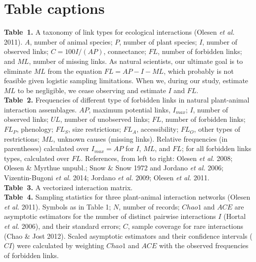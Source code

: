 \documentclass[12pt]{article}
\begin{document}
\section*{Table captions}
\noindent \textbf{Table~1.} A taxonomy of link types for ecological interactions (Olesen \emph{et al.} 2011). $A$, number of animal species; $P$, number of plant species; $I$, number of observed links; $C= 100 I/(AP)$, connectance; $FL$, number of forbidden links; and $ML$, number of missing links. As natural scientists, our ultimate goal is to eliminate $ML$ from the equation $FL = AP - I - ML$, which probably is not feasible given logistic sampling limitations. When we, during our study, estimate $ML$ to be negligible, we cease observing and estimate $I$ and $FL$.\\

\noindent \textbf{Table~2.} Frequencies of different type of forbidden links in natural plant-animal interaction assemblages. $AP$, maximum potential links, $I_{max}$; $I$, number of observed links; $UL$, number of unobserved links; $FL$, number of forbidden links; $FL_P$, phenology; $FL_S$, size restrictions; $FL_A$, accessibility; $FL_O$, other types of restrictions; $ML$, unknown causes (missing links). Relative frequencies (in parentheses) calculated over $I_{max}= AP$ for $I$, $ML$, and $FL$; for all forbidden links types, calculated over $FL$. References, from left to right: Olesen \emph{et al.} 2008; Olesen \& Myrthue unpubl.; Snow \& Snow 1972 and Jordano \emph{et al.} 2006; Vizentin-Bugoni \emph{et al.} 2014; Jordano \emph{et al.} 2009; Olesen \emph{et al.} 2011.  \\

\noindent \textbf{Table~3.} A vectorized interaction matrix.\\

\noindent \textbf{Table~4.} Sampling statistics for three plant-animal interaction networks (Olesen \emph{et al.} 2011). Symbols as in Table 1; $N$, number of records; $Chao1$ and $ACE$ are asymptotic estimators for the number of distinct pairwise interactions $I$ (Hortal \emph{et al.} 2006), and their standard errors; $C$, sample coverage for rare interactions (Chao \& Jost 2012). Scaled asymptotic estimators and their confidence intervals ($CI$) were calculated by weighting $Chao1$ and $ACE$ with the observed frequencies of forbidden links. \\
%
\end{document}
